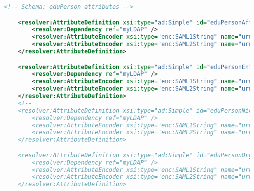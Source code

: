 \begin{lstlisting}[language=xml]
    <!-- Schema: eduPerson attributes -->

    <resolver:AttributeDefinition xsi:type="ad:Simple" id="eduPersonAffiliation" sourceAttributeID="eduPersonAffiliation">
        <resolver:Dependency ref="myLDAP" />
        <resolver:AttributeEncoder xsi:type="enc:SAML1String" name="urn:mace:dir:attribute-def:eduPersonAffiliation" />
        <resolver:AttributeEncoder xsi:type="enc:SAML2String" name="urn:oid:1.3.6.1.4.1.5923.1.1.1.1" friendlyName="eduPersonAffiliation" />
    </resolver:AttributeDefinition>

    <resolver:AttributeDefinition xsi:type="ad:Simple" id="eduPersonEntitlement" sourceAttributeID="eduPersonEntitlement">
        <resolver:Dependency ref="myLDAP" />
        <resolver:AttributeEncoder xsi:type="enc:SAML1String" name="urn:mace:dir:attribute-def:eduPersonEntitlement" />
        <resolver:AttributeEncoder xsi:type="enc:SAML2String" name="urn:oid:1.3.6.1.4.1.5923.1.1.1.7" friendlyName="eduPersonEntitlement" />
    </resolver:AttributeDefinition>
    <!--
    <resolver:AttributeDefinition xsi:type="ad:Simple" id="eduPersonNickname" sourceAttributeID="eduPersonNickname">
        <resolver:Dependency ref="myLDAP" />
        <resolver:AttributeEncoder xsi:type="enc:SAML1String" name="urn:mace:dir:attribute-def:eduPersonNickname" />
        <resolver:AttributeEncoder xsi:type="enc:SAML2String" name="urn:oid:1.3.6.1.4.1.5923.1.1.1.2" friendlyName="eduPersonNickname" />
    </resolver:AttributeDefinition>

    <resolver:AttributeDefinition xsi:type="ad:Simple" id="eduPersonOrgDN" sourceAttributeID="eduPersonOrgDN">
        <resolver:Dependency ref="myLDAP" />
        <resolver:AttributeEncoder xsi:type="enc:SAML1String" name="urn:mace:dir:attribute-def:eduPersonOrgDN" />
        <resolver:AttributeEncoder xsi:type="enc:SAML2String" name="urn:oid:1.3.6.1.4.1.5923.1.1.1.3" friendlyName="eduPersonOrgDN" />
    </resolver:AttributeDefinition>


\end{lstlisting}
